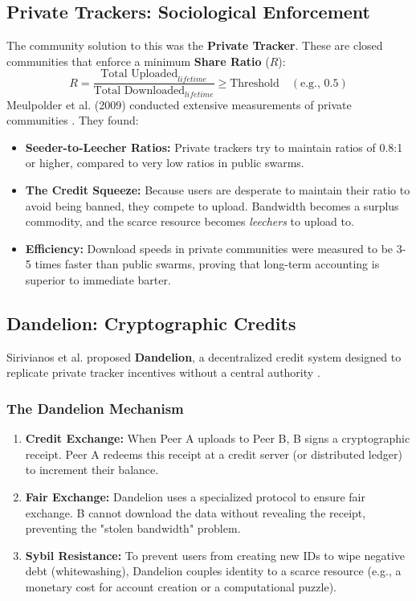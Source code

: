 \documentclass[12pt]{article}
\begin{document}
\subsection{Private Trackers: Sociological Enforcement}
The community solution to this was the \textbf{Private Tracker}. These are closed communities that enforce a minimum \textbf{Share Ratio} ($R$):
\begin{equation}
R = \frac{\text{Total Uploaded}_{lifetime}}{\text{Total Downloaded}_{lifetime}} \ge \text{Threshold} \quad (\text{e.g., } 0.5)
\end{equation}
Meulpolder et al. (2009) conducted extensive measurements of private communities \cite{Meulpolder2009}. They found:
\begin{itemize}
    \item \textbf{Seeder-to-Leecher Ratios:} Private trackers try to maintain ratios of 0.8:1 or higher, compared to very low ratios in public swarms.
    \item \textbf{The Credit Squeeze:} Because users are desperate to maintain their ratio to avoid being banned, they compete to upload. Bandwidth becomes a surplus commodity, and the scarce resource becomes \textit{leechers} to upload to.
    \item \textbf{Efficiency:} Download speeds in private communities were measured to be 3-5 times faster than public swarms, proving that long-term accounting is superior to immediate barter.
\end{itemize}

\subsection{Dandelion: Cryptographic Credits}
Sirivianos et al. proposed \textbf{Dandelion}, a decentralized credit system designed to replicate private tracker incentives without a central authority \cite{Sirivianos2007}.

\subsubsection{The Dandelion Mechanism}
\begin{enumerate}
    \item \textbf{Credit Exchange:} When Peer A uploads to Peer B, B signs a cryptographic receipt. Peer A redeems this receipt at a credit server (or distributed ledger) to increment their balance.
    \item \textbf{Fair Exchange:} Dandelion uses a specialized protocol to ensure fair exchange. B cannot download the data without revealing the receipt, preventing the "stolen bandwidth" problem.
    \item \textbf{Sybil Resistance:} To prevent users from creating new IDs to wipe negative debt (whitewashing), Dandelion couples identity to a scarce resource (e.g., a monetary cost for account creation or a computational puzzle).
\end{enumerate}
\end{document}
